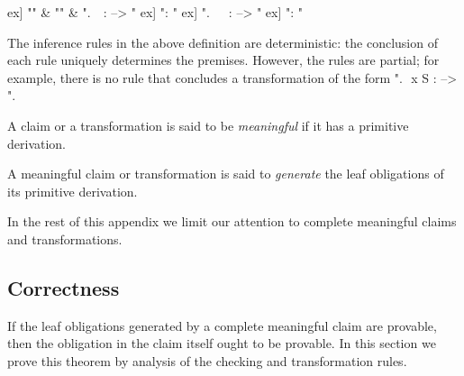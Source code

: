 \documentclass[a4paper]{easychair}
\begin{document}
\begin{defn}
\begin{ecom}
      \1ex]
        {""
         &
         ""
         &
         "\sigma.\ \WITNESS\ \W :  --> "}
      \1ex]
        {"\pi : "}
      \1ex]
        {"\sigma.\ \ \PROOF\ \pi :  --> "}
      \1ex]
        {"\pi : "}
      \
  \end{ecom}
\end{defn}

\noindent The inference rules in the above definition are deterministic: the
conclusion of each rule uniquely determines the premises. However, the
rules are partial; for example, there is no rule that concludes a
transformation of the form "\sigma.\,\TAKE\ x \in S : \obl{\G ||- B
  \land C} --> \obl{\D ||- f}".

\begin{defn} \label{defn:meaningful}
A claim or a transformation is said to be \emph{meaningful} if it
  has a primitive derivation.
\end{defn}

\begin{defn}
A meaningful claim or transformation is said to \emph{generate} the
  leaf obligations of its primitive derivation.
\end{defn}

\noindent In the rest of this appendix we limit our attention to complete
meaningful claims and transformations.

\subsection{Correctness}
\label{apx:correctness}

If the leaf obligations generated by a complete meaningful claim are
provable, then the obligation in the claim itself ought to be
provable. In this section we prove this theorem by analysis of the
checking and transformation rules.
\end{document}
